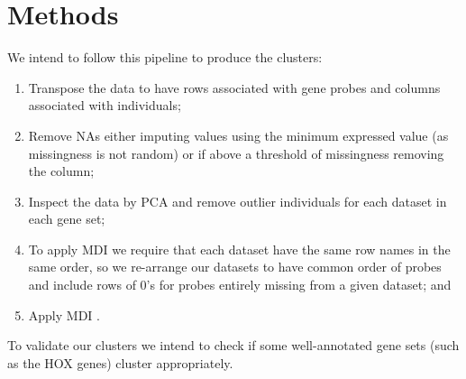 \documentclass[11pt]{article} %
\begin{document}
	\section{Methods}
	We intend to follow this pipeline to produce the clusters:
	\begin{enumerate}
		\item Transpose the data to have rows associated with gene probes and columns associated with individuals;
		\item Remove NAs either imputing values using the minimum expressed value (as missingness is not random) or if above a threshold of missingness removing the column;
		\item Inspect the data by PCA and remove outlier individuals for each dataset in each gene set;
		\item To apply MDI we require that each dataset have the same row names in the same order, so we re-arrange our datasets to have common order of probes and include rows of 0’s for probes entirely missing from a given dataset; and
		\item Apply MDI \cite{mason_mdi-gpu:_2016}.
	\end{enumerate}
	To validate our clusters we intend to check if some well-annotated gene sets (such as the HOX genes) cluster appropriately.
	
	\newpage

	
	
	
\end{document}
